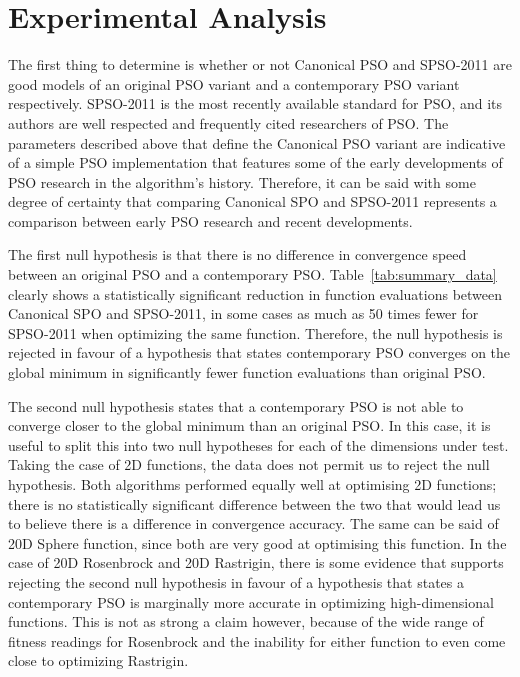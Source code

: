 \documentclass{csfourzero}
\begin{document}


\section{Experimental Analysis}

The first thing to determine is whether or not Canonical PSO and SPSO-2011
are good models of an original PSO variant and a contemporary PSO variant
respectively. SPSO-2011 is the most recently available standard for
PSO, and its authors are well respected and frequently cited researchers of PSO.
The parameters described above that define the Canonical PSO variant are
indicative of a simple PSO implementation that features some of the early
developments of PSO research in the algorithm's history. Therefore, it can be
said with some degree of certainty that comparing Canonical SPO and SPSO-2011
represents a comparison between early PSO research and recent developments.

The first null hypothesis is that there is no difference in convergence speed
between an original PSO and a contemporary PSO. Table~\ref{tab:summary_data}
clearly shows a statistically significant reduction in function evaluations
between Canonical SPO and SPSO-2011, in some cases as much as 50 times fewer for
SPSO-2011 when optimizing the same function. Therefore, the null hypothesis is
rejected in favour of a hypothesis that states contemporary PSO converges on the
global minimum in significantly fewer function evaluations than original PSO.

The second null hypothesis states that a contemporary PSO is not able to
converge closer to the global minimum than an original PSO\@. In this case, it is
useful to split this into two null hypotheses for each of the dimensions under
test. Taking the case of 2D functions, the data does not permit us to reject the
null hypothesis. Both algorithms performed equally well at optimising 2D
functions; there is no statistically significant difference between the two that
would lead us to believe there is a difference in convergence accuracy. The same
can be said of 20D Sphere function, since both are very good at optimising this
function. In the case of 20D Rosenbrock and 20D Rastrigin, there is some
evidence that supports rejecting the second null hypothesis in favour of a
hypothesis that states a contemporary PSO is marginally more accurate in
optimizing high-dimensional functions. This is not as strong a claim however,
because of the wide range of fitness readings for Rosenbrock and the inability
for either function to even come close to optimizing Rastrigin.
\end{document}
